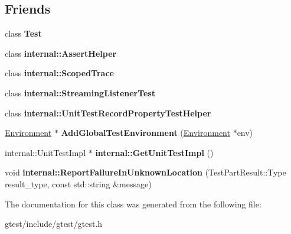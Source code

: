 \subsection*{Friends}
\begin{DoxyCompactItemize}
\item 
\mbox{\label{classtesting_1_1UnitTest_a5b78b1c2e1fa07ffed92da365593eaa4}} 
class {\bfseries Test}
\item 
\mbox{\label{classtesting_1_1UnitTest_a183151aa061362c87572e743fe233db1}} 
class {\bfseries internal\+::\+Assert\+Helper}
\item 
\mbox{\label{classtesting_1_1UnitTest_afa3927576c08d7b1e197ba16b2b3dcb7}} 
class {\bfseries internal\+::\+Scoped\+Trace}
\item 
\mbox{\label{classtesting_1_1UnitTest_adc037d188dab349a94868991955c9cd4}} 
class {\bfseries internal\+::\+Streaming\+Listener\+Test}
\item 
\mbox{\label{classtesting_1_1UnitTest_ae970f89a9f477a349fe5778be85ef42e}} 
class {\bfseries internal\+::\+Unit\+Test\+Record\+Property\+Test\+Helper}
\item 
\mbox{\label{classtesting_1_1UnitTest_a5ec26e4c31220ff8e769cc09689a4d6d}} 
\hyperlink{classtesting_1_1Environment}{Environment} $\ast$ {\bfseries Add\+Global\+Test\+Environment} (\hyperlink{classtesting_1_1Environment}{Environment} $\ast$env)
\item 
\mbox{\label{classtesting_1_1UnitTest_a56e56be7066957d612e53b5c60f6ac08}} 
internal\+::\+Unit\+Test\+Impl $\ast$ {\bfseries internal\+::\+Get\+Unit\+Test\+Impl} ()
\item 
\mbox{\label{classtesting_1_1UnitTest_a73f5a158c13793b90c80d854c9a75120}} 
void {\bfseries internal\+::\+Report\+Failure\+In\+Unknown\+Location} (Test\+Part\+Result\+::\+Type result\+\_\+type, const std\+::string \&message)
\end{DoxyCompactItemize}


The documentation for this class was generated from the following file\+:\begin{DoxyCompactItemize}
\item 
gtest/include/gtest/gtest.\+h\end{DoxyCompactItemize}
